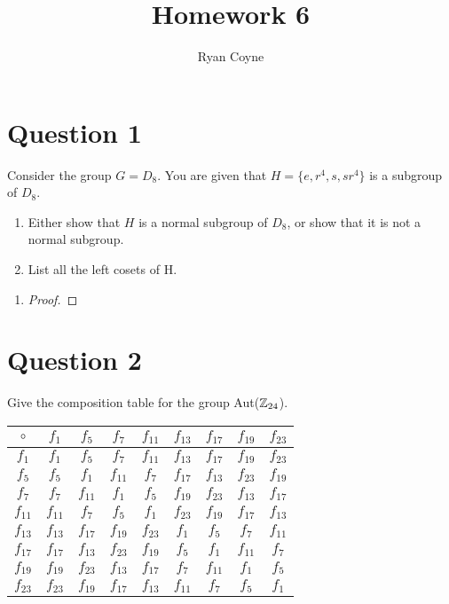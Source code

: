 \documentclass[12pt]{article}
\title{Homework 6}
\author{Ryan Coyne}
\begin{document}
\maketitle

\section*{Question 1}
    Consider the group \(G = D_8\). You are given that \(H = \{e , r^4, s, sr^4\}\) is a subgroup of \(D_8\).
    \begin{enumerate}[label=\alph*)]
        \item Either show that \(H\) is a normal subgroup of \(D_8\), or show that it is not a normal subgroup.
        \item List all the left cosets of H.
    \end{enumerate}
    \begin{enumerate}
        \item \begin{proof}
            
        \end{proof}
    \end{enumerate}

    \section*{Question 2}
    Give the composition table for the group Aut(\(\mathbb{Z}_{24}\)).
    \begin{table}[H]
        \centering
        \begin{tabular}{c|cccccccc}
            \(\circ\) & \(f_1\) & \(f_5\) & \(f_7\) & \(f_{11}\) & \(f_{13}\) & \(f_{17}\) & \(f_{19}\) & \(f_{23}\)\\
            \hline
            \(f_{1}\) &\(f_{1}\) &\(f_{5}\) &\(f_{7}\) &\(f_{11}\) &\(f_{13}\) &\(f_{17}\) &\(f_{19}\) &\(f_{23}\) \\
            \(f_{5}\) &\(f_{5}\) &\(f_{1}\) &\(f_{11}\) &\(f_{7}\) &\(f_{17}\) &\(f_{13}\) &\(f_{23}\) &\(f_{19}\) \\
            \(f_{7}\) &\(f_{7}\) &\(f_{11}\) &\(f_{1}\) &\(f_{5}\) &\(f_{19}\) &\(f_{23}\) &\(f_{13}\) &\(f_{17}\) \\
            \(f_{11}\) &\(f_{11}\) &\(f_{7}\) &\(f_{5}\) &\(f_{1}\) &\(f_{23}\) &\(f_{19}\) &\(f_{17}\) &\(f_{13}\) \\
            \(f_{13}\) &\(f_{13}\) &\(f_{17}\) &\(f_{19}\) &\(f_{23}\) &\(f_{1}\) &\(f_{5}\) &\(f_{7}\) &\(f_{11}\) \\
            \(f_{17}\) &\(f_{17}\) &\(f_{13}\) &\(f_{23}\) &\(f_{19}\) &\(f_{5}\) &\(f_{1}\) &\(f_{11}\) &\(f_{7}\) \\
            \(f_{19}\) &\(f_{19}\) &\(f_{23}\) &\(f_{13}\) &\(f_{17}\) &\(f_{7}\) &\(f_{11}\) &\(f_{1}\) &\(f_{5}\) \\
            \(f_{23}\) &\(f_{23}\) &\(f_{19}\) &\(f_{17}\) &\(f_{13}\) &\(f_{11}\) &\(f_{7}\) &\(f_{5}\) &\(f_{1}\) \\
        \end{tabular}
    \end{table}
\end{document}
